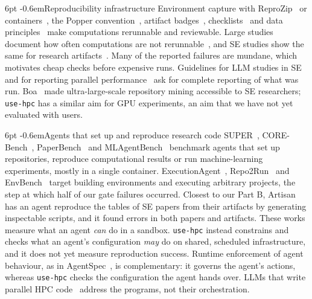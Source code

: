 \documentclass[pdflatex,sn-mathphys-num]{sn-jnl}
\makeatletter
\theoremstyle{thmstyletwo}%
\theoremstyle{thmstylethree}%
\newcommand{\tool}{\texttt{use-hpc}}
\renewcommand\paragraph{\@startsection{paragraph}{4}{\z@}%
  {6pt \@plus 2pt \@minus 1pt}{-0.6em}{\normalfont\normalsize\bfseries}}
\makeatother
\begin{document}
\paragraph{Reproducibility infrastructure} Environment capture with ReproZip~\cite{chirigati2016reprozip} or containers~\cite{kurtzer2017singularity}, the Popper convention~\cite{jimenez2017popper}, artifact badges~\cite{acm2020badges}, checklists~\cite{pineau2021improving} and data principles~\cite{wilkinson2016fair} make computations rerunnable and reviewable. Large studies document how often computations are not rerunnable~\cite{collberg2016repeatability,pimentel2019jupyter,trisovic2022research,gundersen2018state}, and SE studies show the same for research artifacts~\cite{timperley2021artifact,liu2024artifacts}. Many of the reported failures are mundane, which motivates cheap checks before expensive runs. Guidelines for LLM studies in SE~\cite{sallou2024breaking,baltes2025guidelines} and for reporting parallel performance~\cite{hoefler2015scientific} ask for complete reporting of what was run. Boa~\cite{dyer2013boa} made ultra-large-scale repository mining accessible to SE researchers; \tool{} has a similar aim for GPU experiments, an aim that we have not yet evaluated with users.

\paragraph{Agents that set up and reproduce research code} SUPER~\cite{bogin2024super}, CORE-Bench~\cite{siegel2024corebench}, PaperBench~\cite{starace2025paperbench} and MLAgentBench~\cite{huang2024mlagentbench} benchmark agents that set up repositories, reproduce computational results or run machine-learning experiments, mostly in a single container. ExecutionAgent~\cite{bouzenia2025executionagent}, Repo2Run~\cite{hu2025repo2run} and EnvBench~\cite{eliseeva2025envbench} target building environments and executing arbitrary projects, the step at which half of our gate failures occurred. Closest to our Part B, Artisan~\cite{baek2026artisan} has an agent reproduce the tables of SE papers from their artifacts by generating inspectable scripts, and it found errors in both papers and artifacts. These works measure what an agent \emph{can} do in a sandbox. \tool{} instead constrains and checks what an agent's configuration \emph{may} do on shared, scheduled infrastructure, and it does not yet measure reproduction success. Runtime enforcement of agent behaviour, as in AgentSpec~\cite{wang2026agentspec}, is complementary: it governs the agent's actions, whereas \tool{} checks the configuration the agent hands over. LLMs that write parallel HPC code~\cite{nichols2024hpccoder} address the programs, not their orchestration.
\end{document}
